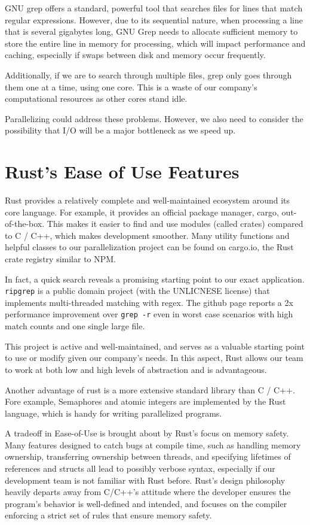GNU grep offers a standard, powerful tool that searches files
for lines that match regular expressions. However, due to its
sequential nature, when processing a line that is several gigabytes 
long, GNU Grep needs to allocate sufficient memory to store 
the entire line in memory for processing, which will impact performance
and caching, especially if swaps between disk and memory occur frequently.

Additionally, if we are to search through multiple files, grep only 
goes through them one at a time, using one core. This is a waste of 
our company's computational resources as other cores stand idle.

Parallelizing could address these problems. However, we also need
to consider the possibility that I/O will be a major bottleneck as we speed up.
\section{Rust's Ease of Use Features}
Rust provides a relatively complete and well-maintained 
ecosystem around its core language. For example, it provides
an official package manager, cargo, out-of-the-box. This makes
it easier to find and use modules (called crates) compared to
C / C++, which makes development smoother. Many utility 
functions and helpful classes to our parallelization project
can be found on cargo.io, the Rust crate registry similar to NPM.

In fact, a quick search reveals a promising starting point to our
exact application. \texttt{ripgrep} is a public domain project 
(with the UNLICNESE license) that implements multi-threaded
matching with regex. The github page reports a 2x performance
improvement over \texttt{grep -r} even in worst case scenarios with
high match counts and one single large file. 

This project is active and well-maintained, and serves as a valuable
starting point to use or modify given our company's needs. In this 
aspect, Rust allows our team to work at both low and high levels
of abstraction and is advantageous.

Another advantage of rust is a more extensive standard library than
C / C++. Fore example, Semaphores and atomic integers are 
implemented by the Rust language, which is handy for writing 
parallelized programs.

A tradeoff in Ease-of-Use is brought about by Rust's focus on 
memory safety. Many features designed to catch bugs at compile
time, such as handling memory ownership, transferring ownership
between threads, and specifying lifetimes of references and structs
all lead to possibly verbose syntax, especially if our development
team is not familiar with Rust before. Rust's design philosophy
heavily departs away from C/C++'s attitude where the developer
ensures the program's behavior is well-defined and intended, and 
focuses on the compiler enforcing a strict set of rules that ensure
memory safety. 

